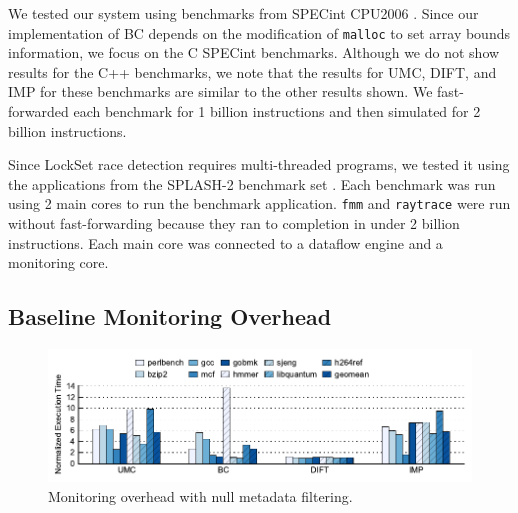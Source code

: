 We tested our system using benchmarks from SPECint CPU2006 \cite{spec2006}.
Since our implementation of BC depends on the modification of {\tt malloc} to
set array bounds information, we focus on the C SPECint benchmarks. Although we
do not show results for the C++ benchmarks, we note that the results for UMC,
DIFT, and IMP for these benchmarks are similar to the other results shown.  We
fast-forwarded each benchmark for 1 billion instructions and then simulated for
2 billion instructions. 

Since LockSet race detection requires multi-threaded programs, we tested it
using the applications from the SPLASH-2 benchmark set \cite{splash-isca95}.
Each benchmark was run using 2 main cores to run the benchmark application.
{\tt fmm} and {\tt raytrace} were run without fast-forwarding because they ran
to completion in under 2 billion instructions.  Each main core was connected to
a dataflow engine and a monitoring core.

\subsection{Baseline Monitoring Overhead}

\begin{figure}
  \begin{center}
    \includegraphics{monitoring_dift_drop/data/filter_mon.pdf}
    \caption{Monitoring overhead with null metadata filtering.}
    \label{fig:monitoring_dift_drop.evaluation.filter_mon}
  \end{center}
\end{figure}


